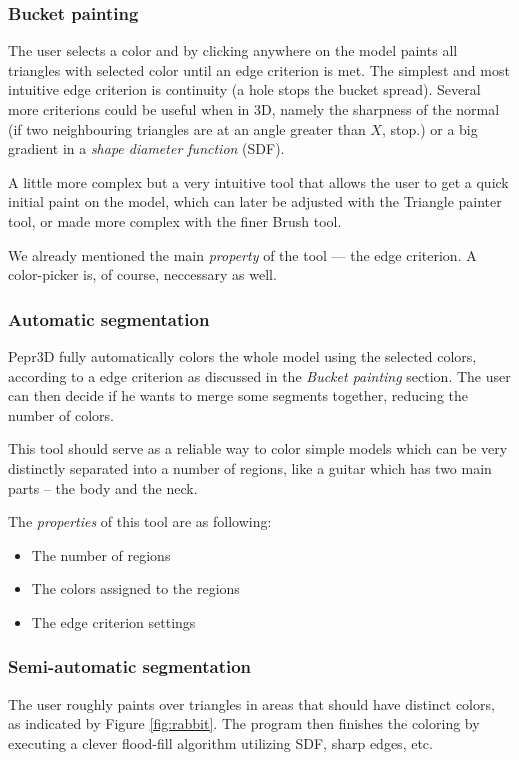 \subsubsection{Bucket painting}
The user selects a color and by clicking anywhere on the model paints all triangles with selected color until an edge criterion is met. The simplest and most intuitive edge criterion is continuity (a hole stops the bucket spread). Several more criterions could be useful when in 3D, namely the sharpness of the normal (if two neighbouring triangles are at an angle greater than $X$, stop.) or a big gradient in a \textit{shape diameter function} (SDF).

A little more complex but a very intuitive tool that allows the user to get a quick initial paint on the model, which can later be adjusted with the Triangle painter tool, or made more complex with the finer Brush tool.

We already mentioned the main \textit{property} of the tool --- the edge criterion. A color-picker is, of course, neccessary as well.

\subsubsection{Automatic segmentation}
Pepr3D fully automatically colors the whole model using the selected colors, according to a edge criterion as discussed in the \textit{Bucket painting} section. The user can then decide if he wants to merge some segments together, reducing the number of colors.

This tool should serve as a reliable way to color simple models which can be very distinctly separated into a number of regions, like a guitar which has two main parts -- the body and the neck.

The \textit{properties} of this tool are as following:
\begin{itemize}
\item The number of regions
\item The colors assigned to the regions
\item The edge criterion settings
\end{itemize}

\subsubsection{Semi-automatic segmentation}
The user roughly paints over triangles in areas that should have distinct colors, as indicated by Figure \ref{fig:rabbit}. The program then finishes the coloring by executing a clever flood-fill algorithm utilizing SDF, sharp edges, etc. 


